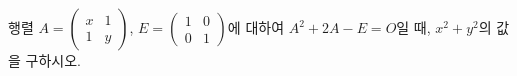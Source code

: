 행렬 $A=\begin{pmatrix} x & 1 \\ 1 & y \end{pmatrix}$, $E=\begin{pmatrix} 1 & 0 \\ 0 & 1 \end{pmatrix}$에 대하여 $A^2+2A-E=O$일 때, $x^2+y^2$의 값을 구하시오. 
